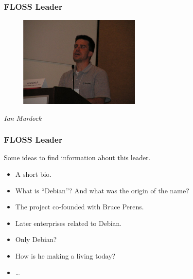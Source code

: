 \documentclass{beamer}
\begin{document}
\begin{frame}
\frametitle{FLOSS Leader}

\begin{figure}[h]
\begin{center}
  \includegraphics[height=1.80in]{figs/ian_murdock.jpg}
\end{center}
\end{figure}

\pause

\begin{center}
{\it Ian Murdock}
\end{center}

\end{frame}

\begin{frame}
\frametitle{FLOSS Leader}

Some ideas to find information about this leader.
\pause
\begin{itemize}
\item A short bio.
\item What is ``Debian''? And what was the origin of the name?
\item The project co-founded with Bruce Perens.
\item Later enterprises related to Debian.
\item Only Debian?
\item How is he making a living today?
\item \ldots
\end{itemize}

\end{frame}
\end{document}
